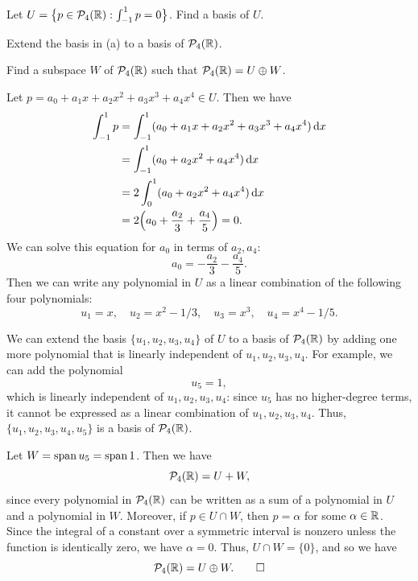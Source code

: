 \begin{exc}
\begin{exercise}\leavevmode
\begin{parts}
\item Let $U=\bigl\{p\in\mathcal{P}_4(\mathbb{R}) : \int_{-1}^1p=0\bigr\}$. Find a basis
  of $U$.
\item Extend the basis in (a) to a basis of $\mathcal{P}_4(\mathbb{R})$.
\item Find a subspace $W$ of $\mathcal{P}_4(\mathbb{R})$ such that $\mathcal{P}_4(\mathbb{R})=U\oplus W$.
\end{parts}
\end{exercise}
\begin{solution}
\begin{parts}
\item Let $p=a_0+a_1x+a_2x^2+a_3x^3+a_4x^4\in U$. Then we have
  \begin{align*}
  \int_{-1}^1p &= \int_{-1}^1(a_0+a_1x+a_2x^2+a_3x^3+a_4x^4)\,\mathrm{d}x\\
    &= \int_{-1}^1(a_0+a_2x^2+a_4x^4)\,\mathrm{d}x\\
    &= 2\int_0^1(a_0+a_2x^2+a_4x^4)\,\mathrm{d}x\\
    &= 2\Bigl(a_0+\frac{a_2}{3}+\frac{a_4}{5}\Bigr) = 0.
  \end{align*}
  We can solve this equation for $a_0$ in terms of $a_2,a_4$:
  \[ a_0 = -\frac{a_2}{3}-\frac{a_4}{5}. \]
  Then we can write any polynomial in $U$ as a linear combination of the
  following four polynomials:
  \[ u_1=x, \quad u_2=x^2-1/3, \quad u_3=x^3, \quad u_4=x^4-1/5. \]
\item We can extend the basis $\{u_1,u_2,u_3,u_4\}$ of $U$ to a basis of
  $\mathcal{P}_4(\mathbb{R})$ by adding one more polynomial that is linearly independent of
  $u_1,u_2,u_3,u_4$. For example, we can add the polynomial
  \[ u_5 = 1, \]
  which is linearly independent of $u_1,u_2,u_3,u_4$: since $u_5$ has no
  higher-degree terms, it cannot be expressed as a linear combination of
  $u_1,u_2,u_3,u_4$. Thus, $\{u_1,u_2,u_3,u_4,u_5\}$ is a basis of
  $\mathcal{P}_4(\mathbb{R})$.
\item Let $W=\operatorname{span} u_5=\operatorname{span} 1$. Then we have
  \[ \mathcal{P}_4(\mathbb{R}) = U+W, \]
  since every polynomial in $\mathcal{P}_4(\mathbb{R})$ can be written as a sum of a
  polynomial in $U$ and a polynomial in $W$. Moreover, if $p\in U\cap W$, then
  $p=\alpha$ for some $\alpha\in\mathbb{R}$. Since the integral of a constant over a
  symmetric interval is nonzero unless the function is identically zero, we
  have $\alpha=0$. Thus, $U\cap W=\{0\}$, and so we have
  \[ \mathcal{P}_4(\mathbb{R}) = U\oplus W. \qedhere \]
\end{parts}
\end{solution}


\end{exc}
